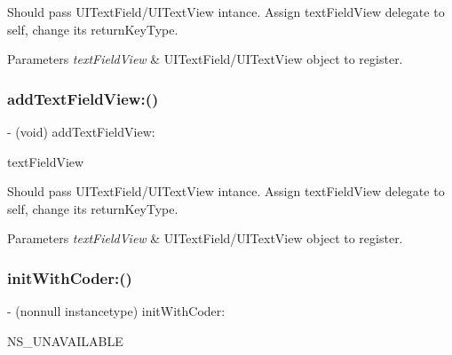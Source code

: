 Should pass U\+I\+Text\+Field/\+U\+I\+Text\+View intance. Assign text\+Field\+View delegate to self, change it\textquotesingle{}s return\+Key\+Type.


\begin{DoxyParams}{Parameters}
{\em text\+Field\+View} & U\+I\+Text\+Field/\+U\+I\+Text\+View object to register. \\
\hline
\end{DoxyParams}
\mbox{\label{interface_i_q_keyboard_return_key_handler_afbac480817c07157f820e34b08a5db70}} 
\subsubsection{\texorpdfstring{add\+Text\+Field\+View\+:()}{addTextFieldView:()}\hspace{0.1cm}{\footnotesize\ttfamily [3/3]}}
{\footnotesize\ttfamily -\/ (void) add\+Text\+Field\+View\+: \begin{DoxyParamCaption}\item[{(nonnull U\+I\+View $\ast$)}]{text\+Field\+View }\end{DoxyParamCaption}}

Should pass U\+I\+Text\+Field/\+U\+I\+Text\+View intance. Assign text\+Field\+View delegate to self, change it\textquotesingle{}s return\+Key\+Type.


\begin{DoxyParams}{Parameters}
{\em text\+Field\+View} & U\+I\+Text\+Field/\+U\+I\+Text\+View object to register. \\
\hline
\end{DoxyParams}
\mbox{\label{interface_i_q_keyboard_return_key_handler_aba05c4f519d0eeda78568a2ba1baeca7}} 
\subsubsection{\texorpdfstring{init\+With\+Coder\+:()}{initWithCoder:()}\hspace{0.1cm}{\footnotesize\ttfamily [1/3]}}
{\footnotesize\ttfamily -\/ (nonnull instancetype) init\+With\+Coder\+: \begin{DoxyParamCaption}\item[{(nullable N\+S\+Coder $\ast$)}]{N\+S\+\_\+\+U\+N\+A\+V\+A\+I\+L\+A\+B\+LE }\end{DoxyParamCaption}}

